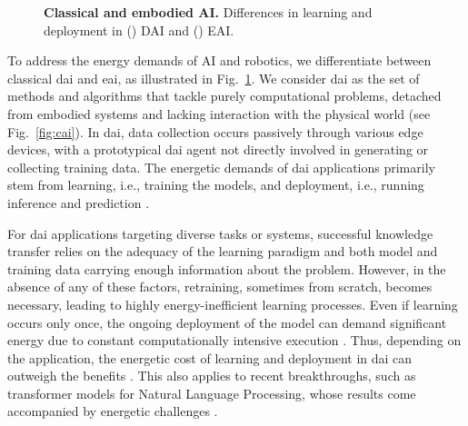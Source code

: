 \documentclass[12pt]{article}
\begin{document}
\begin{figure}[t!]
\begin{subfigure}[t]{0.45\textwidth}
	\end{subfigure}	
	\hspace*{\fill}
	\caption[] {\label{fig:cai_and_eai_general} \textbf{Classical and embodied AI.} Differences in learning and deployment in () DAI and () EAI. %
	}
\end{figure}
To address the energy demands of AI and robotics, we differentiate between classical \acl{dai} and \acl{eai}, as illustrated in Fig.~\ref{fig:cai_and_eai_general}. We consider \ac{dai} as the set of methods and algorithms that tackle purely computational problems, detached from embodied systems and lacking interaction with the physical world (see Fig.~\ref{fig:cai}). In \ac{dai}, data collection occurs passively through various edge devices, with a prototypical \ac{dai} agent not directly involved in generating or collecting training data. The energetic demands of \ac{dai} applications primarily stem from learning, i.e., training the models, and deployment, i.e., running inference and prediction \cite{Vries2023growingenergyfootprint}.

For \ac{dai} applications targeting diverse tasks or systems, successful knowledge transfer relies on the adequacy of the learning paradigm and both model and training data carrying enough information about the problem. However, in the absence of any of these factors, retraining, sometimes from scratch, becomes necessary, leading to highly energy-inefficient learning processes. Even if learning occurs only once, the ongoing deployment of the model can demand significant energy due to constant computationally intensive execution \cite{Vries2023growingenergyfootprint}. Thus, depending on the application, the energetic cost of learning and deployment in \ac{dai} can outweigh the benefits \cite{Strubell2019EnergyPolicyConsiderations}. This also applies to recent breakthroughs, such as transformer models for Natural Language Processing, whose results come accompanied by energetic challenges \cite{Cao2020TowardsAccurateReliable}.
\end{document}
